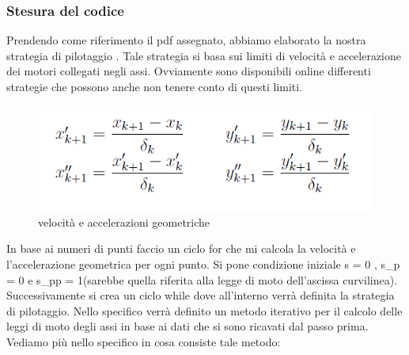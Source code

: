 \documentclass{article}
\begin{document}
    \subsubsection{Stesura del codice}
    Prendendo come riferimento il pdf assegnato, abbiamo elaborato la nostra strategia di pilotaggio .
    Tale strategia si basa sui limiti di velocità e accelerazione dei motori collegati negli assi. Ovviamente sono disponibili online differenti strategie che possono anche non tenere conto di questi limiti.
    
\begin{figure}[H]
\centering
\includegraphics[width=.6\textwidth]{./strategia/velacc_geom.png}
\caption{ velocità e accelerazioni geometriche}
\end{figure}
In base ai numeri di punti faccio un ciclo for che mi calcola la velocità e l'accelerazione geometrica per ogni punto.
Si pone condizione iniziale s = 0 , s\_p = 0 e s\_pp = 1(sarebbe quella riferita alla legge di moto dell'ascissa curvilinea).
Successivamente si crea un ciclo while dove all'interno verrà definita la strategia di pilotaggio. Nello specifico verrà definito un metodo iterativo per il calcolo delle leggi di moto degli assi in base ai dati che si sono ricavati dal passo prima.
Vediamo più nello specifico in cosa consiste tale metodo:
\end{document}
